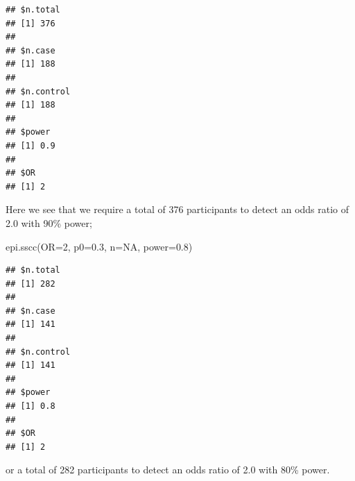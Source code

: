 \documentclass[
]{memoir}
\newenvironment{Shaded}{\begin{snugshade}}{\end{snugshade}}
\newcommand{\AttributeTok}[1]{\textcolor[rgb]{0.77,0.63,0.00}{#1}}
\newcommand{\ConstantTok}[1]{\textcolor[rgb]{0.00,0.00,0.00}{#1}}
\newcommand{\DecValTok}[1]{\textcolor[rgb]{0.00,0.00,0.81}{#1}}
\newcommand{\FloatTok}[1]{\textcolor[rgb]{0.00,0.00,0.81}{#1}}
\newcommand{\FunctionTok}[1]{\textcolor[rgb]{0.00,0.00,0.00}{#1}}
\newcommand{\NormalTok}[1]{#1}
\begin{document}
\begin{verbatim}
## $n.total
## [1] 376
## 
## $n.case
## [1] 188
## 
## $n.control
## [1] 188
## 
## $power
## [1] 0.9
## 
## $OR
## [1] 2
\end{verbatim}

Here we see that we require a total of 376 participants to detect an odds ratio of 2.0 with 90\% power;

\begin{Shaded}
\begin{Highlighting}[]
\FunctionTok{epi.sscc}\NormalTok{(}\AttributeTok{OR=}\DecValTok{2}\NormalTok{, }\AttributeTok{p0=}\FloatTok{0.3}\NormalTok{, }\AttributeTok{n=}\ConstantTok{NA}\NormalTok{, }\AttributeTok{power=}\FloatTok{0.8}\NormalTok{)}
\end{Highlighting}
\end{Shaded}

\begin{verbatim}
## $n.total
## [1] 282
## 
## $n.case
## [1] 141
## 
## $n.control
## [1] 141
## 
## $power
## [1] 0.8
## 
## $OR
## [1] 2
\end{verbatim}

or a total of 282 participants to detect an odds ratio of 2.0 with 80\% power.

  
\end{document}
